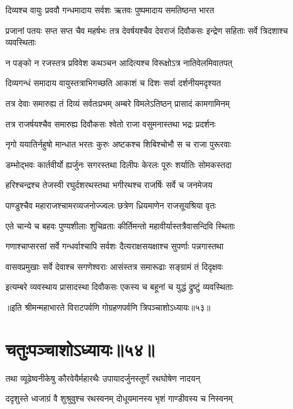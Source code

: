\twolineshloka
{दिव्यश्च वायुः प्रववौ गन्धमादाय सर्वशः}
{ऋतवः पुष्पमादाय समतिष्ठन्त भारत}


\threelineshloka
{प्रजानां पतयः सप्त सप्त चैव महर्षभः}
{तत्र देवर्षयश्चैव देवराजं दिवौकसः}
{इन्द्रेण सहिताः सर्वे त्रिदशाश्च व्यवस्थिताः}


\twolineshloka
{न पङ्को न रजस्तत्र प्रविवेश कथञ्चन}
{आदित्यश्च विरूक्षोऽत्र नातिवेलमिवातपत्}


\twolineshloka
{दिव्यगन्धं समादाय वायुस्तत्राभिगच्छति}
{आकाशं च दिशः सर्वा दर्शनीयमदृश्यत}


\twolineshloka
{तत्र देवाः समारुह्य तं दिव्यं सर्वतःप्रभम्}
{अम्बरे विमलेऽतिष्ठन् प्रासादं कामगामिनम्}


\twolineshloka
{तत्र राजर्षयश्चैव समारुह्य दिवौकसः}
{श्वेतो राजा वसुमनास्तथा भद्रः प्रदर्शनः}


\twolineshloka
{नृगो ययातिर्नहुषो मान्धात भरतः कुरुः}
{अष्टकश्च शिबिश्चोभौ स च राजा पुरूरवाः}


\twolineshloka
{डम्भोद्भवः कार्तवीर्यो ह्यर्जुनः सगरस्तथा}
{दिलीपः केरलः पूरुः शर्यातिः सोमकस्तदा}


\twolineshloka
{हरिश्चन्द्रश्च तेजस्वी रघुर्दशरथस्तथा}
{भगीरथश्च राजर्षिः सर्वे च जनमेजय}


\twolineshloka
{पाण्डुश्चैव महाराजश्चामरव्यजनोज्ज्वलः}
{छत्रेण ध्रियमाणेन राजसूयश्रिया वृतः}


\twolineshloka
{एते चान्ये च बहवः पुण्यशीलाः शुचिव्रताः}
{कीर्तिमन्तो महावीर्यास्तत्रैवासन्दिवि स्थिताः}


\twolineshloka
{गणाश्चाप्सरसां सर्वे गन्धर्वाश्चापि सर्वशः}
{दैत्यराक्षसयक्षाश्च सुपर्णाः पन्नगास्तथा}


\twolineshloka
{वासवप्रमुखाः सर्वे देवाश्च सगणेश्वराः}
{आसंस्तत्र समारूढाः सङ्ग्रामं तं दिदृक्षवः}


\twolineshloka
{इत्यम्बरे व्यवस्थाय प्रासादस्था दिवौकसः}
{एकस्य च बहूनां च युद्धं द्रुष्टुं व्यवस्थिताः}

॥इति श्रीमन्महाभारते विराटपर्वणि गोग्रहणपर्वणि त्रिपञ्चाशोऽध्यायः॥५३॥

\chapter{चतुःपञ्चाशोऽध्यायः॥५४॥}

\twolineshloka
{तथा व्यूढेष्वनीकेषु कौरवेयैर्महारथैः}
{उपायादर्जुनस्तूर्णं रथघोषेण नादयन्}


\twolineshloka
{ददृशुस्ते ध्वजाग्रं वै शुश्रुवुश्च रथस्वनम्}
{दोधूयमानस्य भृशं गाण्डीवस्य च निस्वनम्}


